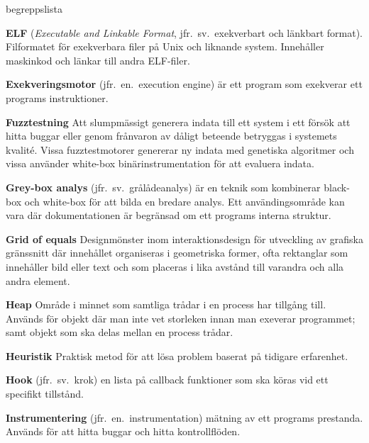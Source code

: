 \begin{labeling}{begreppslista}
    \item [\textbf{ELF}] (\emph{Executable and Linkable Format}, jfr.\ sv.\
          exekverbart och länkbart format). Filformatet för exekverbara filer på Unix
    och liknande system. Innehåller maskinkod och länkar till andra ELF-filer.

    \item [\textbf{Exekveringsmotor}] (jfr.\ en.\ execution engine) är ett program
    som exekverar ett programs instruktioner.

    \item [\textbf{Fuzztestning}] Att slumpmässigt generera indata till ett
    system i ett försök att hitta buggar eller genom frånvaron av dåligt
    beteende betryggas i systemets kvalité. Vissa fuzztestmotorer genererar ny
    indata med genetiska algoritmer och vissa använder white-box
    binärinstrumentation för att evaluera indata.

    \item [\textbf{Grey-box analys}] (jfr.\ sv.\ grålådeanalys) är en teknik som
    kombinerar black-box och white-box för att bilda en bredare analys. Ett
    användingsområde kan vara där  dokumentationen är begränsad om ett programs
    interna struktur.

    \item [\textbf{Grid of equals}] Designmönster inom interaktionsdesign för
    utveckling av grafiska gränssnitt där innehållet organiseras i geometriska
    former, ofta rektanglar som innehåller bild eller text och som placeras i
    lika avstånd till varandra och alla andra element.

    \item [\textbf{Heap}] Område i minnet som samtliga trådar i en process har
    tillgång till. Används för objekt där man inte vet storleken innan man
    exeverar programmet; samt objekt som ska delas mellan en process trådar.

    \item [\textbf{Heuristik}] Praktisk metod för att lösa problem baserat på
    tidigare erfarenhet.

    \item [\textbf{Hook}] (jfr.\ sv.\ krok) en lista på callback funktioner som
    ska köras vid ett specifikt tillstånd.

    \item [\textbf{Instrumentering}] (jfr.\ en.\ instrumentation) mätning av ett
    programs prestanda. Används för att hitta buggar och hitta kontrollflöden.


\end{labeling}
